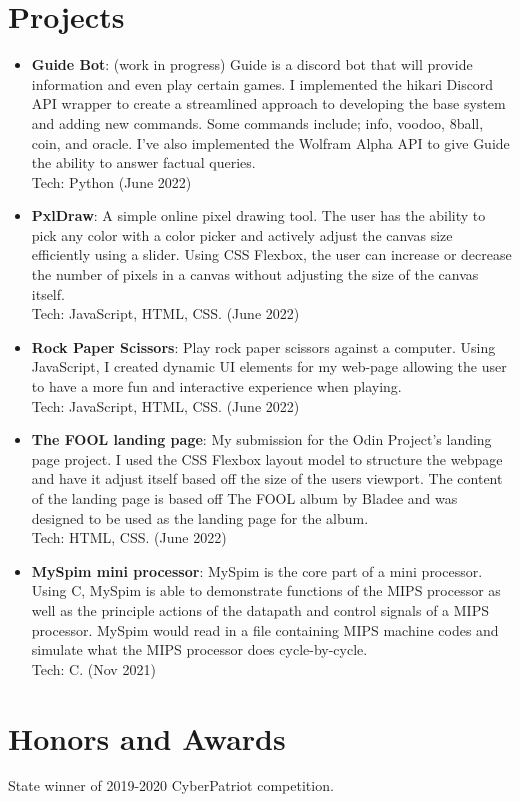 \documentclass[a4paper,20pt]{article}
\newcommand{\resumeItem}[2]{
  \item\normalsize{
    \textbf{#1}{: #2 \vspace{1pt}}
  }
}
\newcommand{\resumeSubItem}[2]{\resumeItem{#1}{#2}\vspace{1pt}}
\newcommand{\resumeSubHeadingListStart}{\begin{itemize}[leftmargin=*]}
\newcommand{\resumeSubHeadingListEnd}{\end{itemize}}
\begin{document}
    \section{Projects}
        \resumeSubHeadingListStart
            \resumeSubItem{Guide Bot}{(work in progress) Guide is a discord bot that will provide information and even play certain games. I implemented the hikari Discord API wrapper to create a streamlined approach to developing the base system and adding new commands. Some commands include; info, voodoo, 8ball, coin, and oracle. I've also implemented the Wolfram Alpha API to give Guide the ability to answer factual queries.\\Tech: Python (June 2022)}
            \resumeSubItem{PxlDraw}{A simple online pixel drawing tool. The user has the ability to pick any color with a color picker and actively adjust the canvas size efficiently using a slider. Using CSS Flexbox, the user can increase or decrease the number of pixels in a canvas without adjusting the size of the canvas itself.\\Tech: JavaScript, HTML, CSS. (June 2022)}
            \resumeSubItem{Rock Paper Scissors}{Play rock paper scissors against a computer. Using JavaScript, I created dynamic UI elements for my web-page allowing the user to have a more fun and interactive experience when playing.\\Tech: JavaScript, HTML, CSS. (June 2022)}
            \resumeSubItem{The FOOL landing page}{My submission for the Odin Project's landing page project. I used the CSS Flexbox layout model to structure the webpage and have it adjust itself based off the size of the users viewport. The content of the landing page is based off The FOOL album by Bladee and was designed to be used as the landing page for the album.\\Tech: HTML, CSS. (June 2022)}
            \resumeSubItem{MySpim mini processor}{MySpim is the core part of a mini processor. Using C, MySpim is able to demonstrate functions of the MIPS processor as well as the principle actions of the datapath and control signals of a MIPS processor. MySpim would read in a file containing MIPS machine codes and simulate what the MIPS processor does cycle-by-cycle.\\Tech: C. (Nov 2021)}
            \vspace{2pt}
        \resumeSubHeadingListEnd
    
    
    \section{Honors and Awards}
        \begin{description}[font=$\bullet$]
            \item {State winner of 2019-2020 CyberPatriot competition.}
        \end{description}
        
\end{document}
